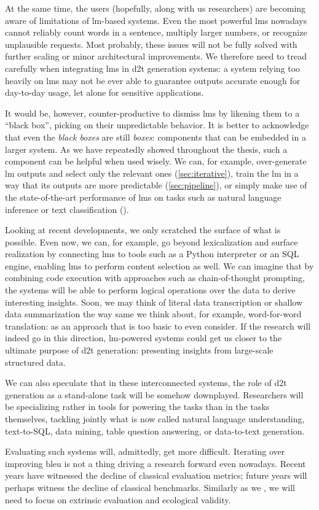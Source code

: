 At the same time, the users (hopefully, along with us researchers) are becoming aware of limitations of \ac{lm}-based systems. Even the most powerful \acp{lm} nowadays cannot reliably count words in a sentence, multiply larger numbers, or recognize unplausible requests. Most probably, these issues will not be fully solved with further scaling or minor architectural improvements. We therefore need to tread carefully when integrating \acp{lm} in \ac{d2t} generation systems: a system relying too heavily on \acp{lm} may not be ever able to guarantee outputs accurate enough for day-to-day usage, let alone for sensitive applications.

It would be, however, counter-productive to dismiss \acp{lm} by likening them to a ``black box'', picking on their unpredictable behavior. It is better to acknowledge that even the \emph{black boxes} are still \emph{boxes}: components that can be embedded in a larger system. As we have repeatedly showed throughout the thesis, such a component can be helpful when used wisely. We can, for example, over-generate \ac{lm} outputs and select only the relevant ones (\autoref{sec:iterative}), train the \ac{lm} in a way that its outputs are more predictable (\autoref{sec:pipeline}), or simply make use of the state-of-the-art performance of \acp{lm} on tasks such as natural language inference or text classification ().

Looking at recent developments, we only scratched the surface of what is possible. Even now, we can, for example, go beyond lexicalization and surface realization by connecting \acp{lm} to tools such as a Python interpreter or an SQL engine, enabling \acp{lm} to perform content selection as well. We can imagine that by combining code execution with approaches such as chain-of-thought prompting, the systems will be able to perform logical operations over the data to derive interesting insights. Soon, we may think of literal data transcription or shallow data summarization the way same we think about, for example, word-for-word translation: as an approach that is too basic to even consider. If the research will indeed go in this direction, \ac{lm}-powered systems could get us closer to the ultimate purpose of \ac{d2t} generation: presenting insights from large-scale structured data.

We can also speculate that in these interconnected systems, the role of \ac{d2t} generation as a stand-alone task will be somehow downplayed. Researchers will be specializing rather in tools for powering the tasks than in the tasks themselves, tackling jointly what is now called natural language understanding, text-to-SQL, data mining, table question answering, or data-to-text generation.

Evaluating such systems will, admittedly, get more difficult. Iterating over improving \acs{bleu} is not a thing driving a research forward even nowadays. Recent years have witnessed the decline of classical evaluation metrics; future years will perhaps witness the decline of classical benchmarks. Similarly as we , we will need to focus on extrinsic evaluation and ecological validity.
